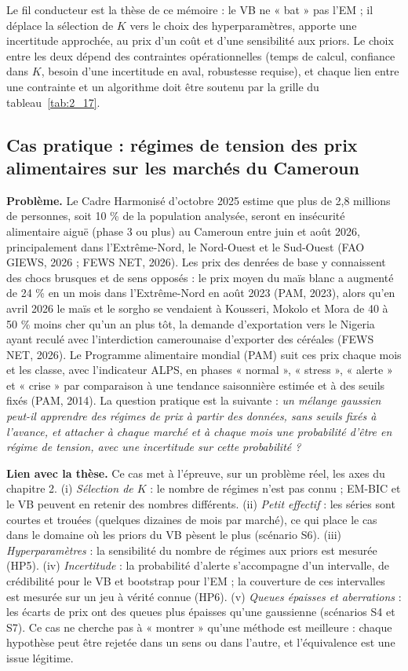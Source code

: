 Le fil conducteur est la thèse de ce mémoire : le VB ne « bat » pas l'EM ; il déplace la sélection de $K$ vers le choix des hyperparamètres, apporte une incertitude approchée, au prix d'un coût et d'une sensibilité aux priors. Le choix entre les deux dépend des contraintes opérationnelles (temps de calcul, confiance dans $K$, besoin d'une incertitude en aval, robustesse requise), et chaque lien entre une contrainte et un algorithme doit être soutenu par la grille du tableau~\ref{tab:2_17}.

\subsection{Cas pratique : régimes de tension des prix alimentaires sur les marchés du Cameroun}
\textbf{Problème. }Le Cadre Harmonisé d'octobre 2025 estime que plus de 2,8 millions de personnes, soit 10 \% de la population analysée, seront en insécurité alimentaire aiguë (phase 3 ou plus) au Cameroun entre juin et août 2026, principalement dans l'Extrême-Nord, le Nord-Ouest et le Sud-Ouest (FAO GIEWS, 2026 ; FEWS NET, 2026). Les prix des denrées de base y connaissent des chocs brusques et de sens opposés : le prix moyen du maïs blanc a augmenté de 24 \% en un mois dans l'Extrême-Nord en août 2023 (PAM, 2023), alors qu'en avril 2026 le maïs et le sorgho se vendaient à Kousseri, Mokolo et Mora de 40 à 50 \% moins cher qu'un an plus tôt, la demande d'exportation vers le Nigeria ayant reculé avec l'interdiction camerounaise d'exporter des céréales (FEWS NET, 2026). Le Programme alimentaire mondial (PAM) suit ces prix chaque mois et les classe, avec l'indicateur ALPS, en phases « normal », « stress », « alerte » et « crise » par comparaison à une tendance saisonnière estimée et à des seuils fixés (PAM, 2014). La question pratique est la suivante : \emph{un mélange gaussien peut-il apprendre des régimes de prix à partir des données, sans seuils fixés à l'avance, et attacher à chaque marché et à chaque mois une probabilité d'être en régime de tension, avec une incertitude sur cette probabilité ?}

\textbf{Lien avec la thèse. }Ce cas met à l'épreuve, sur un problème réel, les axes du chapitre 2. (i) \emph{Sélection de $K$} : le nombre de régimes n'est pas connu ; EM-BIC et le VB peuvent en retenir des nombres différents. (ii) \emph{Petit effectif} : les séries sont courtes et trouées (quelques dizaines de mois par marché), ce qui place le cas dans le domaine où les priors du VB pèsent le plus (scénario S6). (iii) \emph{Hyperparamètres} : la sensibilité du nombre de régimes aux priors est mesurée (HP5). (iv) \emph{Incertitude} : la probabilité d'alerte s'accompagne d'un intervalle, de crédibilité pour le VB et bootstrap pour l'EM ; la couverture de ces intervalles est mesurée sur un jeu à vérité connue (HP6). (v) \emph{Queues épaisses et aberrations} : les écarts de prix ont des queues plus épaisses qu'une gaussienne (scénarios S4 et S7). Ce cas ne cherche pas à « montrer » qu'une méthode est meilleure : chaque hypothèse peut être rejetée dans un sens ou dans l'autre, et l'équivalence est une issue légitime.

